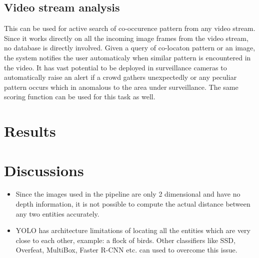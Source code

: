 \documentclass[conference]{IEEEtran}
\begin{document}
    \subsection{Video stream analysis}
    This can be used for active search of co-occurence pattern from any video stream. Since it works directly on all the incoming image frames from the video stream, no database is directly involved. Given a query of co-locaton pattern or an image, the system notifies the user automaticaly when similar pattern is encountered in the video. It has vast potential to be deployed in surveillance cameras to automatically raise an alert if a crowd gathers unexpectedly or any peculiar pattern occurs which in anomalous to the area under surveillance. The same scoring function can be used for this task as well.

\section{Results}


\section{Discussions}
    \begin{itemize}
        \item Since the images used in the pipeline are only 2 dimensional and have no depth information, it is not possible to compute the actual distance between any two entities accurately.
        \item YOLO has architecture limitations of locating all the entities which are very close to each other, example: a flock of birds. Other classifiers like SSD, Overfeat, MultiBox, Faster R-CNN etc. can  used to overcome this issue.
    \end{itemize}
\end{document}
